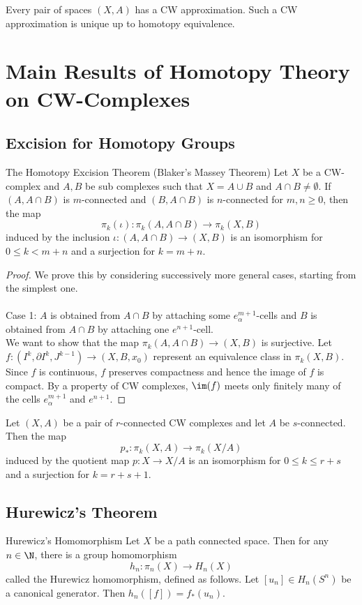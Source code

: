 \documentclass[a4paper]{article}
\begin{document}
\begin{thm}{}{} Every pair of spaces $(X,A)$ has a CW approximation. Such a CW approximation is unique up to homotopy equivalence. 
\end{thm}

\pagebreak

\section{Main Results of Homotopy Theory on CW-Complexes}
\subsection{Excision for Homotopy Groups}
\begin{thm}{The Homotopy Excision Theorem (Blaker's Massey Theorem)}{} Let $X$ be a CW-complex and $A,B$ be sub complexes such that $X=A\cup B$ and $A\cap B\neq\emptyset$. If $(A,A\cap B)$ is $m$-connected and $(B,A\cap B)$ is $n$-connected for $m,n\geq 0$, then the map $$\pi_k(\iota):\pi_k(A,A\cap B)\to\pi_k(X,B)$$ induced by the inclusion $\iota:(A,A\cap B)\to(X,B)$ is an isomorphism for $0\leq k<m+n$ and a surjection for $k=m+n$. \tcbline
\begin{proof}
We prove this by considering successively more general cases, starting from the simplest one. \\~\\

Case 1: $A$ is obtained from $A\cap B$ by attaching some $e_\alpha^{m+1}$-cells and $B$ is obtained from $A\cap B$ by attaching one $e^{n+1}$-cell. \\
We want to show that the map $\pi_k(A,A\cap B)\to(X,B)$ is surjective. Let $f:(I^k,\partial I^k,J^{k-1})\to(X,B,x_0)$ represent an equivalence class in $\pi_k(X,B)$. Since $f$ is continuous, $f$ preserves compactness and hence the image of $f$ is compact. By a property of CW complexes, $\im(f)$ meets only finitely many of the cells $e_\alpha^{m+1}$ and $e^{n+1}$. 
\end{proof}
\end{thm}

\begin{prp}{}{} Let $(X,A)$ be a pair of $r$-connected CW complexes and let $A$ be $s$-connected. Then the map $$p_\ast:\pi_k(X,A)\to\pi_k(X/A)$$ induced by the quotient map $p:X\to X/A$ is an isomorphism for $0\leq k\leq r+s$ and a surjection for $k=r+s+1$. 
\end{prp}

\subsection{Hurewicz's Theorem}
\begin{thm}{Hurewicz's Homomorphism}{} Let $X$ be a path connected space. Then for any $n\in\N$, there is a group homomorphism $$h_n:\pi_n(X)\to H_n(X)$$ called the Hurewicz homomorphism, defined as follows. Let $[u_n]\in H_n(S^n)$ be a canonical generator. Then $h_n([f])=f_\ast(u_n)$. 
\end{thm}
\end{document}

